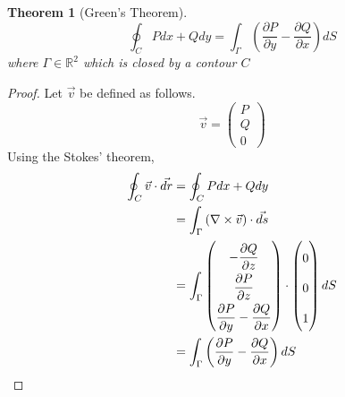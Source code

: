 \documentclass[letterpaper, 12pt]{article}
\theoremstyle{custom}
\newtheorem*{theorem}{Theorem}
\begin{document}
\begin{theorem}[Green's Theorem]
  \begin{equation*}
    \oint_C P dx + Q dy = \int_{\Gamma} \left( \frac{\partial P}{\partial y} - \frac{\partial Q}{\partial x} \right) dS
  \end{equation*}
  where $\Gamma \in \mathbb{R}^2$ which is closed by a contour $C$
\end{theorem}
\begin{proof}
  Let $\vec{v}$ be defined as follows.
  \begin{equation*}
    \vec{v} = 
    \begin{pmatrix}
      P \\ Q \\ 0
    \end{pmatrix}
  \end{equation*}
Using the Stokes' theorem,
\begin{align*}
  \oint_{C} \vec{v} \cdot \vec{dr}
  &= \oint_C P dx + Q dy \\
  &= \int_{\Gamma} \left( \nabla \times \vec{v} \right) \cdot \vec{ds} \\
  &= \int_{\Gamma}\renewcommand{\arraystretch}{2}
  \begin{pmatrix}
      \displaystyle -\frac{\partial Q}{\partial z} \\
      \displaystyle \frac{\partial P}{\partial z}  \\
      \displaystyle \frac{\partial P}{\partial y} - \frac{\partial Q}{\partial x}
    \end{pmatrix}
    \cdot
    \begin{pmatrix}
      \displaystyle 0 \\
      \displaystyle 0 \\
      \displaystyle 1
    \end{pmatrix}
    dS \\
    &= \int_{\Gamma} \left( \frac{\partial P}{\partial y} - \frac{\partial Q}{\partial x} \right) dS
\end{align*}
\end{proof}
\end{document}
